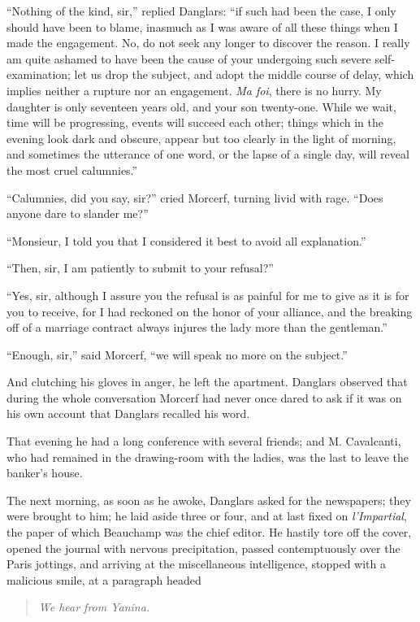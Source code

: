 “Nothing of the kind, sir,” replied Danglars: “if such had been the
case, I only should have been to blame, inasmuch as I was aware of all
these things when I made the engagement. No, do not seek any longer to
discover the reason. I really am quite ashamed to have been the cause
of your undergoing such severe self-examination; let us drop the
subject, and adopt the middle course of delay, which implies neither a
rupture nor an engagement. \textit{Ma foi}, there is no hurry. My daughter is
only seventeen years old, and your son twenty-one. While we wait, time
will be progressing, events will succeed each other; things which in
the evening look dark and obscure, appear but too clearly in the light
of morning, and sometimes the utterance of one word, or the lapse of a
single day, will reveal the most cruel calumnies.”

“Calumnies, did you say, sir?” cried Morcerf, turning livid with rage.
“Does anyone dare to slander me?”

“Monsieur, I told you that I considered it best to avoid all
explanation.”

“Then, sir, I am patiently to submit to your refusal?”

“Yes, sir, although I assure you the refusal is as painful for me to
give as it is for you to receive, for I had reckoned on the honor of
your alliance, and the breaking off of a marriage contract always
injures the lady more than the gentleman.”

“Enough, sir,” said Morcerf, “we will speak no more on the subject.”

And clutching his gloves in anger, he left the apartment. Danglars
observed that during the whole conversation Morcerf had never once
dared to ask if it was on his own account that Danglars recalled his
word.

That evening he had a long conference with several friends; and M.
Cavalcanti, who had remained in the drawing-room with the ladies, was
the last to leave the banker’s house.

The next morning, as soon as he awoke, Danglars asked for the
newspapers; they were brought to him; he laid aside three or four, and
at last fixed on \textit{l’Impartial}, the paper of which Beauchamp was the
chief editor. He hastily tore off the cover, opened the journal with
nervous precipitation, passed contemptuously over the Paris jottings,
and arriving at the miscellaneous intelligence, stopped with a
malicious smile, at a paragraph headed

\begin{quote}
{\small\textit{We hear from Yanina.}}
\end{quote}

